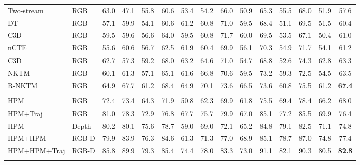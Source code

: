 \documentclass[twocolumn]{svjour3}          \smartqed  \usepackage{graphicx}
\begin{document}
\begin{table*}[t]
\begin{tabular}{llccccccccccccc}
Two-stream & RGB & 63.0 & 47.1 & 55.8 & 60.6 & 53.4 & 54.2 & 66.0 & 50.9 & 65.3 & 55.5 & 68.0 & 51.9 & 57.6 \\

DT & RGB & 57.1 & 59.9 & 54.1 & 60.6 & 61.2 & 60.8 & 71.0 & 59.5 & 68.4 & 51.1 & 69.5 & 51.5 & 60.4 \\ 
     
C3D & RGB & 59.5 & 59.6 & 56.6 & 64.0 & 59.5 & 60.8 & 71.7 & 60.0 & 69.5 & 53.5 & 67.1 & 50.4 & 61.0 \\

nCTE & RGB & 55.6 & 60.6 & 56.7 & 62.5 & 61.9 & 60.4 & 69.9 & 56.1 & 70.3 & 54.9 & 71.7 & 54.1 & 61.2 \\ 

C3D & RGB & 62.7 & 57.3 & 59.2 & 68.0 & 63.2 & 64.6 & 71.0 & 54.7 & 68.8 & 52.6 & 74.3 & 62.8 & 63.3 \\

NKTM & RGB & 60.1 & 61.3 & 57.1 & 65.1 & 61.6 & 66.8 & 70.6 & 59.5 & 73.2 & 59.3 & 72.5 & 54.5 & 63.5 \\ 

R-NKTM & RGB & 64.9 & 67.7 & 61.2 & 68.4 & 64.9 & 70.1 & 73.6 & 66.5 & 73.6 & 60.8 & 75.5 & 61.2 & \textbf{67.4} \\

\noalign{\smallskip}\hline\noalign{\smallskip}
\multicolumn{ 15}{c}{\textbf{Proposed}} \\
\noalign{\smallskip}\hline\noalign{\smallskip}


HPM & RGB & 72.4 & 73.4 & 64.3 & 71.9 & 50.8 & 62.3 & 69.9 & 61.8 & 75.5 & 69.4 & 78.4 & 66.2 & 68.0 \\ 

HPM+Traj & RGB & 81.0 & 78.3 & 72.9 & 76.8 & 67.7 & 75.7 & 79.9 & 67.0 & 85.1 & 77.2 & 85.5 & 69.9 & 76.4 \\ 

HPM & Depth & 80.2 & 80.1 & 75.6 & 78.7 & 59.0 & 69.0 & 72.1 & 65.2 & 84.8 & 79.1 & 82.5 & 71.1 & 74.8 \\ 

HPM+HPM & RGB-D & 79.9 & 83.9 & 76.3 & 84.6 & 61.3 & 71.3 & 77.0 & 68.9 & 85.1 & 78.7 & 87.0 & 74.8 & 77.4 \\

HPM+HPM+Traj & RGB-D & 85.8 & 89.9 & 79.3 & 85.4 & 74.4 & 78.0 & 83.3 & 73.0 & 91.1 & 82.1 & 90.3 & 80.5 & \textbf{82.8}\\

\hline\noalign{\smallskip}
\end{tabular}
\label{tab:uwa_comp}
\end{table*}
\end{document}
